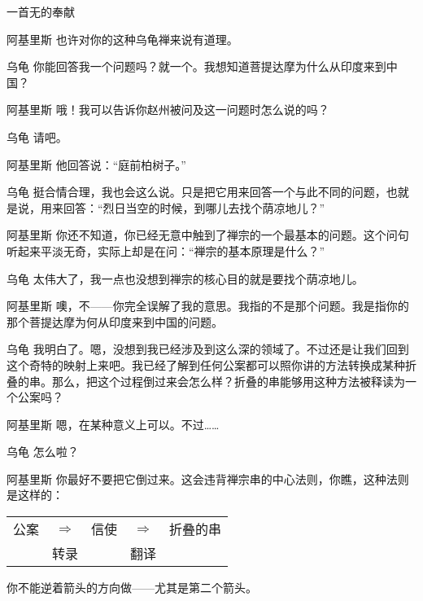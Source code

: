 \begin{dialog}{一首无的奉献\label{abcd}}
\begin{dialogue}
\item[阿基里斯]也许对你的这种乌龟禅来说有道理。

\item[乌龟]你能回答我一个问题吗？就一个。我想知道菩提达摩为什么从印度来到中国？

\item[阿基里斯]哦！我可以告诉你赵州被问及这一问题时怎么说的吗？

\item[乌龟]请吧。

\item[阿基里斯]他回答说：“庭前柏树子。”

\item[乌龟]挺合情合理，我也会这么说。只是把它用来回答一个与此不同的问题，也就是说，用来回答：“烈日当空的时候，到哪儿去找个荫凉地儿？”

\item[阿基里斯]你还不知道，你已经无意中触到了禅宗的一个最基本的问题。这个问句听起来平淡无奇，实际上却是在问：“禅宗的基本原理是什么？”

\item[乌龟]太伟大了，我一点也没想到禅宗的核心目的就是要找个荫凉地儿。

\item[阿基里斯]噢，不——你完全误解了我的意思。我指的不是那个问题。我是指你的那个菩提达摩为何从印度来到中国的问题。

\item[乌龟]我明白了。嗯，没想到我已经涉及到这么深的领域了。不过还是让我们回到这个奇特的映射上来吧。我已经了解到任何公案都可以照你讲的方法转换成某种折叠的串。那么，把这个过程倒过来会怎么样？折叠的串能够用这种方法被释读为一个公案吗？

\item[阿基里斯]嗯，在某种意义上可以。不过……

\item[乌龟]怎么啦？

\item[阿基里斯]你最好不要把它倒过来。这会违背禅宗串的中心法则，你瞧，这种法则是这样的：
    \begin{center}
    \begin{tabular}{ccccc}
     公案  & $\Longrightarrow$ & 信使 & $\Longrightarrow$ & 折叠的串 \\
         & 转录                                 &     & 翻译 
    \end{tabular}
    \end{center}
你不能逆着箭头的方向做——尤其是第二个箭头。


\end{dialogue}
\end{dialog}
